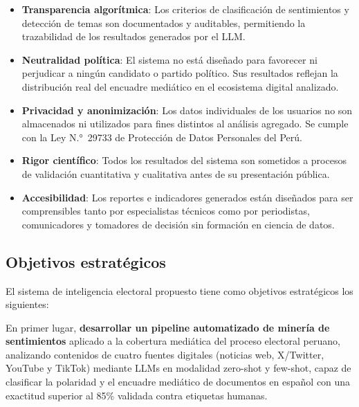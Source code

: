 \begin{itemize}
    \item \textbf{Transparencia algorítmica}: Los criterios de clasificación de sentimientos y detección de temas son documentados y auditables, permitiendo la trazabilidad de los resultados generados por el LLM.

    \item \textbf{Neutralidad política}: El sistema no está diseñado para favorecer ni perjudicar a ningún candidato o partido político. Sus resultados reflejan la distribución real del encuadre mediático en el ecosistema digital analizado.

    \item \textbf{Privacidad y anonimización}: Los datos individuales de los usuarios no son almacenados ni utilizados para fines distintos al análisis agregado. Se cumple con la Ley N.°~29733 de Protección de Datos Personales del Perú.

    \item \textbf{Rigor científico}: Todos los resultados del sistema son sometidos a procesos de validación cuantitativa y cualitativa antes de su presentación pública.

    \item \textbf{Accesibilidad}: Los reportes e indicadores generados están diseñados para ser comprensibles tanto por especialistas técnicos como por periodistas, comunicadores y tomadores de decisión sin formación en ciencia de datos.
\end{itemize}

\subsection{Objetivos estratégicos}

El sistema de inteligencia electoral propuesto tiene como objetivos estratégicos los siguientes:

En primer lugar, \textbf{desarrollar un pipeline automatizado de minería de sentimientos} aplicado a la cobertura mediática del proceso electoral peruano, analizando contenidos de cuatro fuentes digitales (noticias web, X/Twitter, YouTube y TikTok) mediante LLMs en modalidad zero-shot y few-shot, capaz de clasificar la polaridad y el encuadre mediático de documentos en español con una exactitud superior al 85\% validada contra etiquetas humanas.

